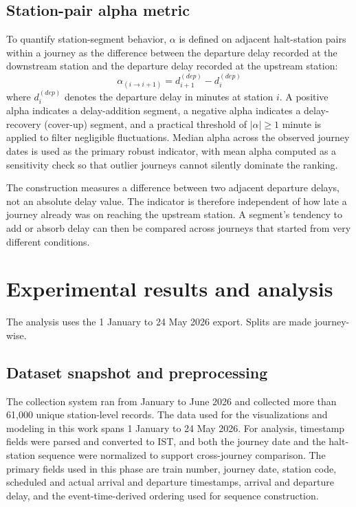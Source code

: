 \documentclass[a4paper,fleqn]{cas-dc}
\begin{document}
\subsection{Station-pair alpha metric}
To quantify station-segment behavior, $\alpha$ is defined on adjacent
halt-station pairs within a journey as the difference between the departure
delay recorded at the downstream station and the departure delay recorded at
the upstream station:
\begin{equation}
\alpha_{(i \rightarrow i+1)} = d_{i+1}^{(dep)} - d_i^{(dep)}
\label{eq:alpha}
\end{equation}
where $d_i^{(dep)}$ denotes the departure delay in minutes at station $i$. A
positive alpha indicates a delay-addition segment, a negative alpha indicates
a delay-recovery (cover-up) segment, and a practical threshold of
$|\alpha| \geq 1$ minute is applied to filter negligible fluctuations. Median
alpha across the observed journey dates is used as the primary robust
indicator, with mean alpha computed as a sensitivity check so that outlier
journeys cannot silently dominate the ranking.

The construction measures a difference between two adjacent departure delays,
not an absolute delay value. The indicator is therefore independent of how late
a journey already was on reaching the upstream station. A segment's tendency to
add or absorb delay can then be compared across journeys that started from
very different conditions.

\section{Experimental results and analysis}
\label{sec:results}

The analysis uses the 1 January to 24 May 2026 export. Splits are made
journey-wise.

\subsection{Dataset snapshot and preprocessing}
The collection system ran from January to June 2026 and collected more than
61{,}000 unique station-level records. The data used for the visualizations
and modeling in this work spans 1 January to 24 May 2026. For analysis,
timestamp fields were parsed and converted to IST, and both the journey date
and the halt-station sequence were normalized to support cross-journey
comparison. The primary fields used in this phase are train number, journey
date, station code, scheduled and actual arrival and departure timestamps,
arrival and departure delay, and the event-time-derived ordering used for
sequence construction.
\end{document}
